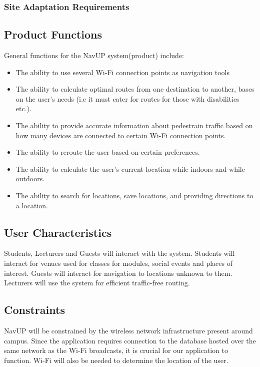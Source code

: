 \documentclass{article}
\begin{document}
        \subsubsection{Site Adaptation Requirements}
    \subsection{Product Functions}
		\begin{flushleft}
			General functions for the NavUP system(product) include:
			\begin{itemize}
   		 	\item The ability to use several Wi-Fi connection points as navigation tools
			 	\item The ability to calculate optimal routes from one destination to another, bases on the user's needs (i.e it must cater for routes for those with disabilities etc.).
			 	\item The ability to provide accurate information about pedestrain traffic based on how many devices are connected to certain Wi-Fi connection points.
				 \item The ability to reroute the user based on certain preferences.
				 \item The ability to calculate the user's current location while indoors and while outdoors.
				 \item The ability to search for locations, save locations, and providing directions to a location. 
			\end{itemize}
		\end{flushleft}
    \subsection{User Characteristics}
        \begin{flushleft}
            Students, Lecturers and Guests will interact with the system.
            \break
            Students will interact for venues used for classes for modules, social events and places of interest.
            Guests will interact for navigation to locations unknown to them.
            Lecturers will use the system for efficient traffic-free routing.
        \end{flushleft}
    \subsection{Constraints}
        \begin{flushleft}
        NavUP will be constrained by the wireless network infrastructure present around campus. Since the application requires connection to the database hosted over the same network as the Wi-Fi broadcasts, it is crucial for our application to function. Wi-Fi will also be needed to determine the location of the user.
        \end{flushleft}
        
\end{document}
